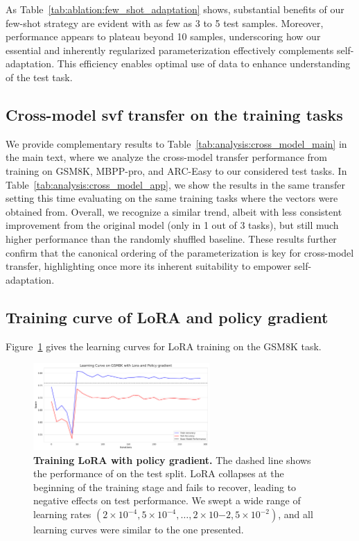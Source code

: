 

As Table~\ref{tab:ablation:few_shot_adaptation} shows, substantial benefits of our few-shot strategy are evident with as few as 3 to 5 test samples.
Moreover, performance appears to plateau beyond 10 samples, underscoring how our essential and inherently regularized \svdacro parameterization effectively complements self-adaptation.
This efficiency enables optimal use of data to enhance understanding of the test task.

\subsection{Cross-model svf transfer on the training tasks}
We provide complementary results to Table~\ref{tab:analysis:cross_model_main} in the main text, where we analyze the \svdacro cross-model transfer performance from training on GSM8K, MBPP-pro, and ARC-Easy to our considered test tasks. In Table~\ref{tab:analysis:cross_model_app}, we show the results in the same transfer setting this time evaluating \mistral on the same training tasks where the \llama \svdacro vectors were obtained from. Overall, we recognize a similar trend, albeit with less consistent improvement from the original model (only in 1 out of 3 tasks), but still much higher performance than the randomly shuffled baseline. These results further confirm that the canonical ordering of the \svdacro parameterization is key for cross-model transfer, highlighting once more its inherent suitability to empower self-adaptation.



\subsection{Training curve of LoRA and policy gradient}

Figure~\ref{app:fig:lora_learning_curves} gives the learning curves for LoRA training on the GSM8K task.

\begin{figure}[h]
    \centering
    \includegraphics[width=0.6\textwidth]{images/lora_training_curve.pdf}
    \caption{\textbf{Training LoRA with policy gradient.} The dashed line shows the performance of \llama on the test split. LoRA collapses at the beginning of the training stage and fails to recover, leading to negative effects on test performance. We swept a wide range of learning rates $(2 \times 10^{-4}, 5 \times 10^{-4}, \dots, 2\times 10{-2}, 5\times 10^{-2})$, and all learning curves were similar to the one presented.}
    \label{app:fig:lora_learning_curves}
\end{figure}
